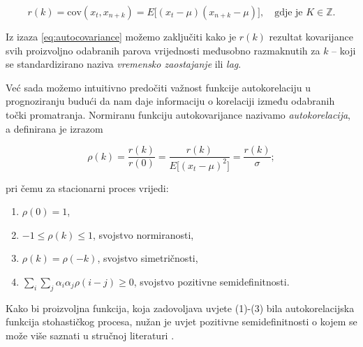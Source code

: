 \documentclass[a4paper,12pt,oneside]{memoir}
\begin{document}
            \begin{equation}
                r(k)=\mathrm{cov}(x_t,x_{n+k})=E\big[(x_t-\mu)(x_{n+k}-\mu)\big], \quad \text{gdje je } K\in \mathbb{Z}.
                \label{eq:autocovariance}
            \end{equation}

            Iz izaza \eqref{eq:autocovariance} možemo zaključiti kako je $r(k)$ rezultat kovarijance svih proizvoljno odabranih parova vrijednosti međusobno razmaknutih za $k$ -- koji se standardizirano naziva \textit{vremensko zaostajanje} ili \textit{lag}.
            
            Već sada možemo intuitivno predočiti važnost funkcije autokorelaciju u prognoziranju budući da nam daje informaciju o korelaciji između odabranih točki promatranja. Normiranu funkciju autokovarijance nazivamo \textit{autokorelacija}, a definirana je izrazom

            \begin{equation}
                \rho(k)=\frac{r(k)}{r(0)}=\frac{r(k)}{E\big[(x_t-\mu)^2\big]}=\frac{r(k)}{\sigma};
                \label{autocorrelation}
            \end{equation}

            pri čemu za stacionarni proces vrijedi\cite{Bahovec}:

            \begin{enumerate}
                \item $\rho(0)=1$,
                \item $-1\leq \rho(k)\leq 1$, \quad svojstvo normiranosti,
                \item $\rho(k)=\rho(-k)$, \quad svojstvo simetričnosti,
                \item $\displaystyle\sum_i\sum_j\alpha_i\alpha_j\rho(i-j)\geq0$, \quad svojstvo pozitivne semidefinitnosti.
            \end{enumerate}

            Kako bi proizvoljna funkcija, koja zadovoljava uvjete (1)-(3) bila autokorelacijska funkcija stohastičkog procesa, nužan je uvjet pozitivne semidefinitnosti o kojem se može više saznati u stručnoj literaturi \cite{Priestley}.
\end{document}
